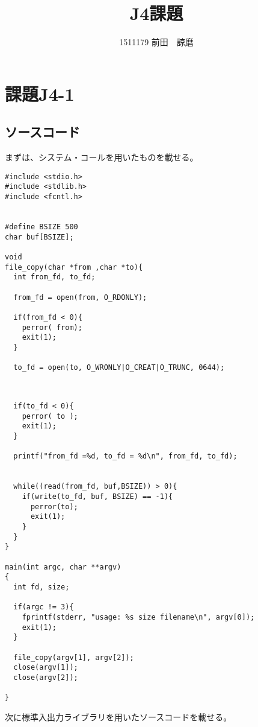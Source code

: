 \documentclass[12pt, a4paper, titlepage]{jsarticle}
\begin{document}
\begin{titlepage}
\title{J4課題}
\author{1511179  前田　諒磨}
\maketitle
\end{titlepage}
\section{課題J4-1}
\subsection{ソースコード}
まずは、システム・コールを用いたものを載せる。
\begin{screen}
\begin{verbatim}
#include <stdio.h>
#include <stdlib.h>
#include <fcntl.h>


#define BSIZE 500
char buf[BSIZE];

void
file_copy(char *from ,char *to){
  int from_fd, to_fd;

  from_fd = open(from, O_RDONLY);

  if(from_fd < 0){
    perror( from);
    exit(1);
  }

  to_fd = open(to, O_WRONLY|O_CREAT|O_TRUNC, 0644);

 \end{verbatim}
\end{screen}
\begin{screen}
\begin{verbatim}


  if(to_fd < 0){
    perror( to );
    exit(1);
  }

  printf("from_fd =%d, to_fd = %d\n", from_fd, to_fd);
  

  while((read(from_fd, buf,BSIZE)) > 0){
    if(write(to_fd, buf, BSIZE) == -1){
      perror(to);
      exit(1);
    }
  }
}

main(int argc, char **argv)
{
  int fd, size;

  if(argc != 3){
    fprintf(stderr, "usage: %s size filename\n", argv[0]);
    exit(1);
  }

  file_copy(argv[1], argv[2]);
  close(argv[1]);
  close(argv[2]);

}

\end{verbatim}
\end{screen}


次に標準入出力ライブラリを用いたソースコードを載せる。
\end{document}
